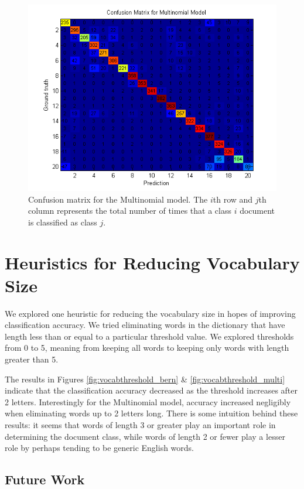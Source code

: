 \documentclass[12pt]{article}
\begin{document}
\begin{figure}[!t]
  \centering
  \includegraphics[scale=1]{img/confusionmat_multi.png}
  \caption{Confusion matrix for the Multinomial model. The \(i\)th row and \(j\)th column represents the total number of times that a class \(i\) document is classified as class \(j\).}
  \label{fig:confusionmat_multi}
\end{figure}

\section{Heuristics for Reducing Vocabulary Size}

We explored one heuristic for reducing the vocabulary size in hopes of improving classification accuracy. We tried eliminating words in the dictionary that have length less than or equal to a particular threshold value. We explored thresholds from 0 to 5, meaning from keeping all words to keeping only words with length greater than 5.

The results in Figures \ref{fig:vocabthreshold_bern} \& \ref{fig:vocabthreshold_multi} indicate that the classification accuracy decreased as the threshold increases after 2 letters. Interestingly for the Multinomial model, accuracy increased negligibly when eliminating words up to 2 letters long. There is some intuition behind these results: it seems that words of length 3 or greater play an important role in determining the document class, while words of length 2 or fewer play a lesser role by perhaps tending to be generic English words.

\subsection{Future Work}
\end{document}
